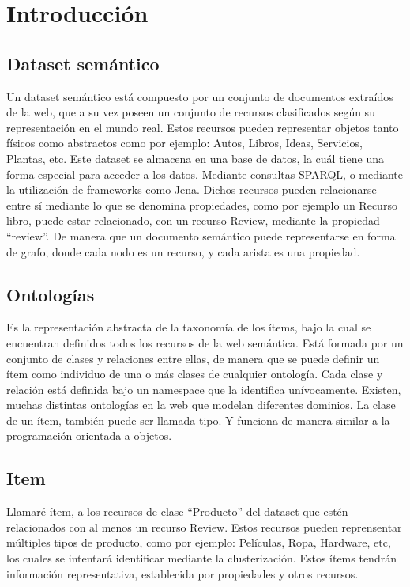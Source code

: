 \section{Introducción}

\subsection{Dataset semántico}

Un dataset semántico está compuesto por un conjunto de documentos extraídos de la web, que a su vez poseen un conjunto de recursos
clasificados según su representación en el mundo real. Estos recursos pueden representar objetos tanto físicos como abstractos como por ejemplo: Autos, Libros, Ideas, 
Servicios, Plantas, etc.
Este dataset se almacena en una base de datos, la cuál tiene una forma especial para acceder a los datos. Mediante consultas SPARQL, o 
mediante la utilización de frameworks como Jena.
Dichos recursos pueden relacionarse entre sí mediante lo que se denomina propiedades, como por ejemplo un Recurso libro, puede estar 
relacionado, con un recurso Review, mediante la propiedad ``review''. De manera que un documento semántico puede representarse en forma de grafo, 
donde cada nodo es un recurso, y cada arista es una propiedad.


\subsection{Ontologías}

Es la representación abstracta de la taxonomía de los ítems, bajo la cual se encuentran definidos todos los recursos de la web semántica.
Está formada por un conjunto de clases y relaciones entre ellas, de manera que se puede definir un ítem como individuo de una o más clases 
de cualquier ontología. Cada clase y relación está definida bajo un namespace que la identifica unívocamente.
Existen, muchas distintas ontologías en la web que modelan diferentes dominios. 
La clase de un ítem, también puede ser llamada tipo. Y funciona de manera similar a la programación orientada a objetos. 

\subsection{Item}

Llamaré ítem, a los recursos de clase ``Producto'' del dataset que estén relacionados con al menos un recurso Review. Estos recursos pueden reprensentar 
múltiples tipos de producto, como por ejemplo: Películas, Ropa, Hardware, etc, los cuales se intentará identificar mediante la clusterización.
Estos ítems tendrán información representativa, establecida por propiedades y otros recursos.

